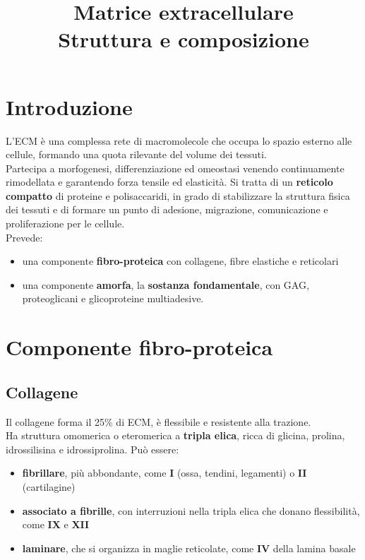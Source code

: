 \documentclass[a4paper, 12pt]{article}
\date{}
\title{%
  Matrice extracellulare \\
  \large Struttura e composizione
}
\begin{document}
\maketitle

\section{Introduzione}
L'ECM è una complessa rete di macromolecole che occupa lo spazio esterno alle cellule, formando una quota rilevante del volume dei tessuti.\\
Partecipa a morfogenesi, differenziazione ed omeostasi venendo continuamente rimodellata e garantendo forza tensile ed elasticità.
Si tratta di un \textbf{reticolo compatto} di proteine e polisaccaridi, in grado di stabilizzare la struttura fisica dei tessuti e di formare un punto di adesione, migrazione, comunicazione e proliferazione per le cellule.\\
Prevede:
\begin{itemize}
  \item una componente \textbf{fibro-proteica} con collagene, fibre elastiche e reticolari
  \item una componente \textbf{amorfa}, la \textbf{sostanza fondamentale}, con GAG, proteoglicani e glicoproteine multiadesive.
\end{itemize}

\section{Componente fibro-proteica}
\subsection{Collagene}
Il collagene forma il 25\% di ECM, è flessibile e resistente alla trazione.\\
Ha struttura omomerica o eteromerica a \textbf{tripla elica}, ricca di glicina, prolina, idrossilisina e idrossiprolina. Può essere:
\begin{itemize}
  \item \textbf{fibrillare}, più abbondante, come \textbf{I} (ossa, tendini, legamenti) o \textbf{II} (cartilagine)
  \item \textbf{associato a fibrille}, con interruzioni nella tripla elica che donano flessibilità, come \textbf{IX} e \textbf{XII}
  \item \textbf{laminare}, che si organizza in maglie reticolate, come \textbf{IV} della lamina basale
\end{itemize}
\end{document}
